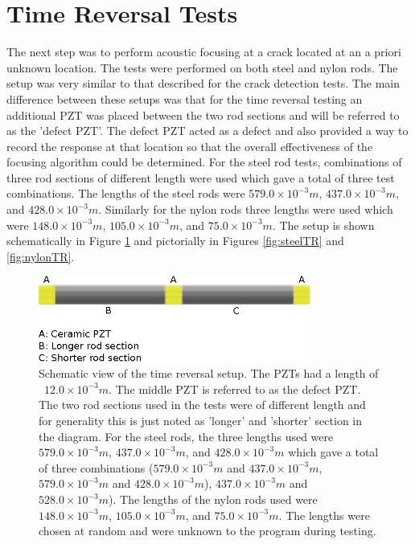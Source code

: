 \section{Time Reversal Tests}
The next step was to perform acoustic focusing at a crack located at an a priori unknown location. The tests were performed on both steel and nylon rods. The setup was very similar to that described for the crack detection tests. The main difference between these setups was that for the time reversal testing an additional PZT was placed between the two rod sections and will be referred to as the 'defect PZT'. The defect PZT acted as a defect and also provided a way to record the response at that location so that the overall effectiveness of the focusing algorithm could be determined. For the steel rod tests, combinations of three rod sections of different length were used which gave a total of three test combinations. The lengths of the steel rods were $579.0 \times 10^{-3} m$, $437.0 \times 10^{-3} m$, and $428.0 \times 10^{-3} m$. Similarly for the nylon rods three lengths were used which were $148.0 \times 10^{-3} m$, $105.0 \times 10^{-3} m$, and $75.0 \times 10^{-3} m$. The setup is shown schematically in Figure \ref{fig:tr_dimensions} and pictorially in Figures \ref{fig:steelTR} and \ref{fig:nylonTR}.

\begin{figure}[ht!]
\centering
\includegraphics[width=0.8\textwidth]{eps_pics/tr_dimensions}
\caption{Schematic view of the time reversal setup. The PZTs had a length of ~$12.0 \times 10^{-3}m$. The middle PZT is referred to as the defect PZT. The two rod sections used in the tests were of different length and for generality this is just noted as 'longer' and 'shorter' section in the diagram. For the steel rods, the three lengths used were $579.0 \times 10^{-3} m$, $437.0 \times 10^{-3} m$, and $428.0 \times 10^{-3} m$ which gave a total of three combinations ($579.0 \times 10^{-3} m$ and $437.0 \times 10^{-3} m$, $579.0 \times 10^{-3} m$ and $428.0 \times 10^{-3} m$), $437.0 \times 10^{-3} m$ and $528.0 \times 10^{-3} m$). The lengths of the nylon rods used were $148.0 \times 10^{-3} m$, $105.0 \times 10^{-3} m$, and $75.0 \times 10^{-3} m$. The lengths were chosen at random and were unknown to the program during testing.
 	 \label{fig:tr_dimensions}} 
\end{figure}

